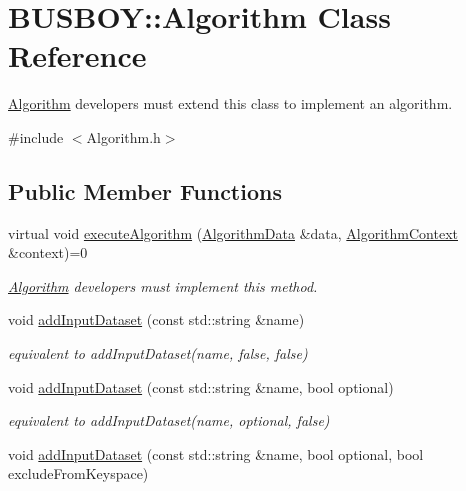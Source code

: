 \hypertarget{classBUSBOY_1_1Algorithm}{
\section{BUSBOY::Algorithm Class Reference}
\label{classBUSBOY_1_1Algorithm}
}


\hyperlink{classBUSBOY_1_1Algorithm}{Algorithm} developers must extend this class to implement an algorithm.  


{\ttfamily \#include $<$Algorithm.h$>$}\subsection*{Public Member Functions}
\begin{DoxyCompactItemize}
\item 
virtual void \hyperlink{classBUSBOY_1_1Algorithm_aff24ae92d1e8391b86d3eb9f1d3f614b}{executeAlgorithm} (\hyperlink{classBUSBOY_1_1AlgorithmData}{AlgorithmData} \&data, \hyperlink{classBUSBOY_1_1AlgorithmContext}{AlgorithmContext} \&context)=0
\begin{DoxyCompactList}\small\item\em \hyperlink{classBUSBOY_1_1Algorithm}{Algorithm} developers must implement this method. \item\end{DoxyCompactList}\item 
void \hyperlink{classBUSBOY_1_1Algorithm_a87b146b82d04e5fa4f312f1d3d66bc59}{addInputDataset} (const std::string \&name)
\begin{DoxyCompactList}\small\item\em equivalent to {\ttfamily addInputDataset(name, false, false)} \item\end{DoxyCompactList}\item 
void \hyperlink{classBUSBOY_1_1Algorithm_a8c4aad6a31a4e5fa6309e530d777209d}{addInputDataset} (const std::string \&name, bool optional)
\begin{DoxyCompactList}\small\item\em equivalent to {\ttfamily addInputDataset(name, optional, false)} \item\end{DoxyCompactList}\item 
void \hyperlink{classBUSBOY_1_1Algorithm_af9887c6a1119a626e16c5ba7202e889b}{addInputDataset} (const std::string \&name, bool optional, bool excludeFromKeyspace)
\item 

\end{DoxyCompactItemize}
